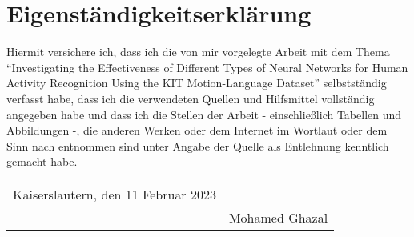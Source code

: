 \section*{Eigenständigkeitserklärung}
Hiermit versichere ich, dass ich die von mir vorgelegte Arbeit mit dem Thema ``Investigating the Effectiveness of Different Types of Neural Networks for Human Activity Recognition Using the KIT Motion-Language Dataset'' selbstständig verfasst habe, dass ich die verwendeten Quellen und Hilfsmittel vollständig angegeben habe und dass ich die Stellen der Arbeit - einschließlich Tabellen und Abbildungen -, die anderen Werken oder dem Internet im Wortlaut oder dem Sinn nach entnommen sind unter Angabe der Quelle als Entlehnung kenntlich gemacht habe.\newline
\begin{table}[H]
	\vspace{2cm}
	\begin{tabular}{@{}p{3in}p{3.25in}@{}}
		Kaiserslautern, den 11 Februar 2023 & \\\cline{2-2}	
						    & Mohamed Ghazal
	\end{tabular}
\end{table}
\newpage
